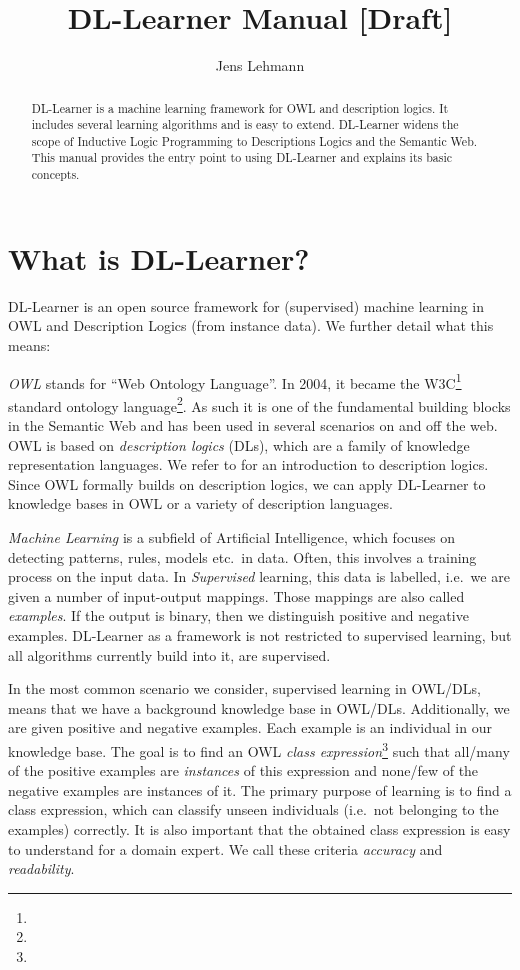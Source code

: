 \documentclass[a4paper,12pt]{scrartcl}
\title{DL-Learner Manual [Draft]}
\author{Jens Lehmann}
\begin{document}
\maketitle

\begin{abstract}
DL-Learner is a machine learning framework for OWL and description logics. It includes several learning algorithms and is easy to extend. DL-Learner widens the scope of Inductive Logic Programming to Descriptions Logics and the Semantic Web. This manual provides the entry point to using DL-Learner and explains its basic concepts.
\end{abstract}

\tableofcontents

\clearpage

\section{What is DL-Learner?}
\label{sec:whatis}

DL-Learner is an open source framework for (supervised) machine learning in OWL and Description Logics (from instance data). We further detail what this means:

\emph{OWL} stands for ``Web Ontology Language''. In 2004, it became the W3C\footnote{\wwwc} standard ontology language\footnote{\owl}. As such it is one of the fundamental building blocks in the Semantic Web and has been used in several scenarios on and off the web. OWL is based on \emph{description logics} (DLs), which are a family of knowledge representation languages. We refer to \cite{dlhb} for an introduction to description logics. Since OWL formally builds on description logics, we can apply DL-Learner to knowledge bases in OWL or a variety of description languages.

\emph{Machine Learning} is a subfield of Artificial Intelligence, which focuses on detecting patterns, rules, models etc.~in data. Often, this involves a training process on the input data. In \emph{Supervised} learning, this data is labelled, i.e.~we are given a number of input-output mappings. Those mappings are also called \emph{examples}. If the output is binary, then we distinguish positive and negative examples. DL-Learner as a framework is not restricted to supervised learning, but all algorithms currently build into it, are supervised.

In the most common scenario we consider, supervised learning in OWL/DLs, means that we have a background knowledge base in OWL/DLs. Additionally, we are given positive and negative examples. Each example is an individual in our knowledge base. The goal is to find an OWL \emph{class expression}\footnote{\owlce} such that all/many of the positive examples are \emph{instances} of this expression and none/few of the negative examples are instances of it. The primary purpose of learning is to find a class expression, which can classify unseen individuals (i.e.~not belonging to the examples) correctly. It is also important that the obtained class expression is easy to understand for a domain expert. We call these criteria \emph{accuracy} and \emph{readability}.
\end{document}

